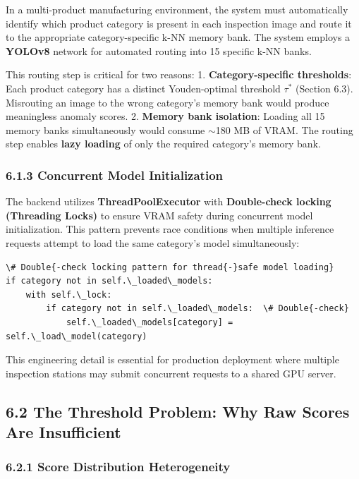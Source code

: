 \documentclass[12pt, a4paper, oneside]{report}
\begin{document}
In a multi-product manufacturing environment, the system must automatically identify which product category is present in each inspection image and route it to the appropriate category-specific k-NN memory bank. The system employs a \textbf{YOLOv8} network for automated routing into 15 specific k-NN banks.

This routing step is critical for two reasons: 1. \textbf{Category-specific thresholds}: Each product category has a distinct Youden-optimal threshold \(\tau^*\) (Section 6.3). Misrouting an image to the wrong category's memory bank would produce meaningless anomaly scores. 2. \textbf{Memory bank isolation}: Loading all 15 memory banks simultaneously would consume ${\sim}$180 MB of VRAM. The routing step enables \textbf{lazy loading} of only the required category's memory bank.

\subsubsection{6.1.3 Concurrent Model Initialization}\label{concurrent-model-initialization}

The backend utilizes \textbf{ThreadPoolExecutor} with \textbf{Double-check locking (Threading Locks)} to ensure VRAM safety during concurrent model initialization. This pattern prevents race conditions when multiple inference requests attempt to load the same category's model simultaneously:

\begin{lstlisting}
\# Double{-check locking pattern for thread{-}safe model loading}
if category not in self.\_loaded\_models:
    with self.\_lock:
        if category not in self.\_loaded\_models:  \# Double{-check}
            self.\_loaded\_models[category] = self.\_load\_model(category)
\end{lstlisting}

This engineering detail is essential for production deployment where multiple inspection stations may submit concurrent requests to a shared GPU server.

\bigskip\noindent\hrulefill\bigskip

\subsection{6.2 The Threshold Problem: Why Raw Scores Are Insufficient}\label{the-threshold-problem-why-raw-scores-are-insufficient}

\subsubsection{6.2.1 Score Distribution Heterogeneity}\label{score-distribution-heterogeneity}
\end{document}
